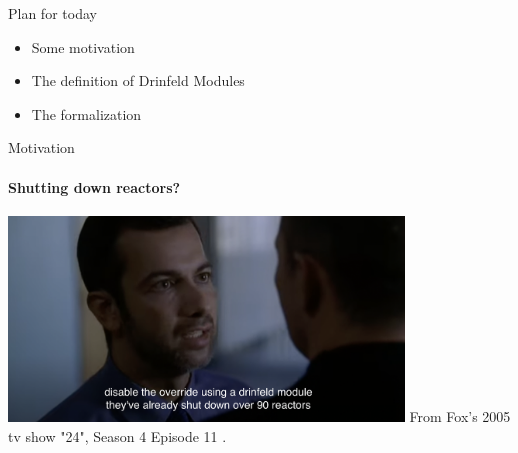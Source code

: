 \begin{frame}
    \titlepage 
\end{frame}

\logo{}


\begin{frame}{Plan for today}
	\begin{itemize}
		\item Some motivation
		\item The definition of Drinfeld Modules
		\item The formalization
	\end{itemize}
\end{frame}

\begin{frame}{Motivation}
	\framesubtitle{Shutting down reactors?}
	\includegraphics[width=10.5cm]{images/drinfeld_module_24.png}
	From Fox's 2005 tv show "24", Season 4 Episode 11 .
\end{frame}



